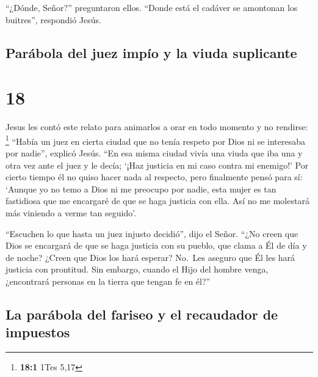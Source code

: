  ``¿Dónde, Señor?'' preguntaron ellos. ``Donde está el
cadáver se amontonan los buitres'', respondió Jesús.

\hypertarget{paruxe1bola-del-juez-impuxedo-y-la-viuda-suplicante}{%
\subsection{Parábola del juez impío y la viuda
suplicante}\label{paruxe1bola-del-juez-impuxedo-y-la-viuda-suplicante}}

\hypertarget{section-17}{%
\section{18}\label{section-17}}

 Jesus les contó este relato para animarlos a orar en todo
momento y no rendirse: \footnote{\textbf{18:1} 1Tes 5,17} 
``Había un juez en cierta ciudad que no tenía respeto por Dios ni se
interesaba por nadie'', explicó Jesús.  ``En esa misma
ciudad vivía una viuda que iba una y otra vez ante el juez y le decía;
`¡Haz justicia en mi caso contra mi enemigo!'  Por cierto
tiempo él no quiso hacer nada al respecto, pero finalmente pensó para
sí: `Aunque yo no temo a Dios ni me preocupo por nadie, 
esta mujer es tan fastidiosa que me encargaré de que se haga justicia
con ella. Así no me molestará más viniendo a verme tan seguido'.

 ``Escuchen lo que hasta un juez injusto decidió'', dijo
el Señor.  ``¿No creen que Dios se encargará de que se
haga justicia con su pueblo, que clama a Él de día y de noche? ¿Creen
que Dios los hará esperar?  No.~Les aseguro que Él les
hará justicia con prontitud. Sin embargo, cuando el Hijo del hombre
venga, ¿encontrará personas en la tierra que tengan fe en él?''

\hypertarget{la-paruxe1bola-del-fariseo-y-el-recaudador-de-impuestos}{%
\subsection{La parábola del fariseo y el recaudador de
impuestos}\label{la-paruxe1bola-del-fariseo-y-el-recaudador-de-impuestos}}

